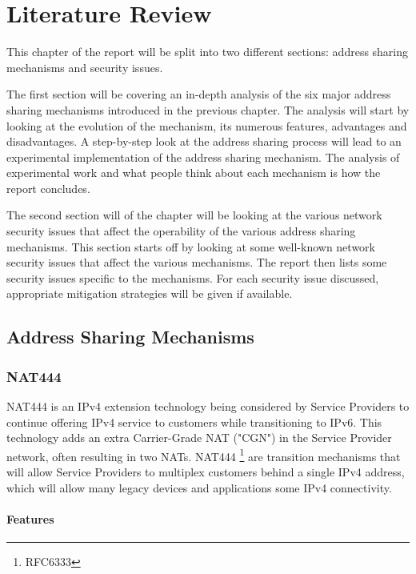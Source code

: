 \documentclass[iwp,first]{luthesis}
\begin{document}
\chapter{Literature Review}

This chapter of the report will be split into two different sections: address sharing mechanisms and security issues. 

The first section will be covering an in-depth analysis of the six major address sharing mechanisms introduced in the previous chapter. The analysis will start by looking at the evolution of the mechanism, its numerous features, advantages and disadvantages. A step-by-step look at the address sharing process will lead to an experimental implementation of the address sharing mechanism. The analysis of experimental work and what people think about each mechanism is how the report concludes.  

The second section will of the chapter will be looking at the various network security issues that affect the operability of the various address sharing mechanisms. This section starts off by looking at some well-known network security issues that affect the various mechanisms. The report then lists some security issues specific to the mechanisms. For each security issue discussed, appropriate mitigation strategies will be given if available.  


\section{Address Sharing Mechanisms}

\subsection{NAT444}

NAT444 is an IPv4 extension technology being considered by Service
   Providers to continue offering IPv4 service to customers while
   transitioning to IPv6.  This technology adds an extra Carrier-Grade
   NAT ("CGN") in the Service Provider network, often resulting in two
   NATs.
NAT444 \footnote[1]{RFC6333} are transition mechanisms that will
   allow Service Providers to multiplex customers behind a single IPv4
   address, which will allow many legacy devices and applications some
   IPv4 connectivity.

\subsubsection {Features}
\end{document}
